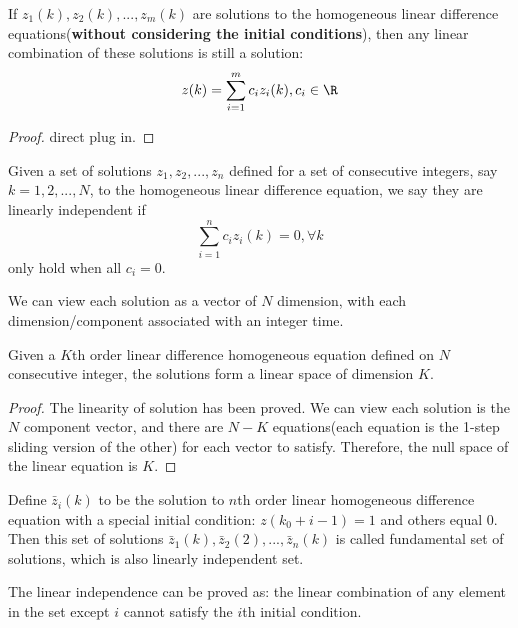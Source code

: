 \begin{refsection}
\begin{lemma}
If $z_1(k),z_2(k),...,z_m(k)$ are solutions to the homogeneous linear difference equations(\textbf{without considering the initial conditions}), then any linear combination of these solutions is still a solution:
$$z(k)=\sum_{i=1}^m c_i z_i(k),c_i\in \R$$
\end{lemma}
\begin{proof}
direct plug in.
\end{proof}


\begin{definition}
Given a set of solutions $z_1,z_2,...,z_n$  defined for a set of consecutive integers, say $k=1,2,...,N$, to the homogeneous linear difference equation, we say they are linearly independent if
$$\sum_{i=1}^n c_i z_i(k) = 0, \forall k$$
only hold when all $c_i = 0$. 
\end{definition}


\begin{remark}
We can view each solution as a vector of $N$ dimension, with each dimension/component associated with an integer time.
\end{remark}

\begin{theorem}
Given a $K$th order linear difference homogeneous equation defined on $N$ consecutive integer, the solutions form a linear space of dimension $K$.
\end{theorem}
\begin{proof}
The linearity of solution has been proved. We can view each solution is the $N$  component vector, and there are $N-K$ equations(each equation is the 1-step sliding version of the other) for each vector to satisfy. Therefore, the null space of the linear equation is $K$.
\end{proof}


\begin{definition}
\cite{luenberger1979introduction}Define $\bar{z}_i(k)$ to be the solution to $n$th order linear homogeneous difference equation with a special initial condition: $z(k_0+i-1)=1$ and others equal 0. Then this set of solutions $\bar{z}_1(k),\bar{z}_2(2),...,\bar{z}_n(k)$ is called fundamental set of solutions, which is also linearly independent set. 
\end{definition}

\begin{remark}
The linear independence can be proved as: the linear combination of any element in the set except $i$ cannot satisfy the $i$th initial condition.
\end{remark}



\end{refsection}
